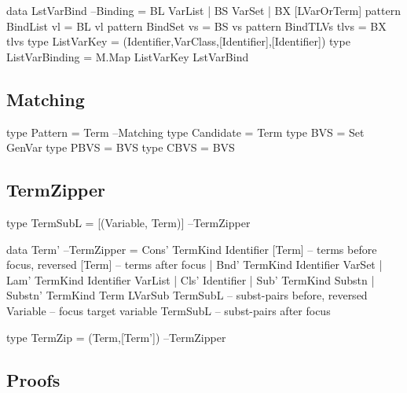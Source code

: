 \begin{code}
data LstVarBind                                                      --Binding
 = BL  VarList
 | BS  VarSet
 | BX  [LVarOrTerm]
pattern BindList vl      =  BL vl
pattern BindSet  vs      =  BS vs
pattern BindTLVs tlvs    =  BX tlvs
type ListVarKey = (Identifier,VarClass,[Identifier],[Identifier])
type ListVarBinding = M.Map ListVarKey LstVarBind
\end{code}

\subsection{Matching}

\begin{code}
type Pattern = Term                                                 --Matching
type Candidate = Term
type BVS = Set GenVar
type PBVS = BVS
type CBVS = BVS
\end{code}

\subsection{TermZipper}

\begin{code}
type TermSubL = [(Variable, Term)]                              --TermZipper
\end{code}

\begin{code}
data Term'                                                        --TermZipper
  = Cons'   TermKind Identifier [Term] -- terms before focus, reversed
                                [Term] -- terms after focus
  | Bnd'   TermKind Identifier VarSet
  | Lam'    TermKind Identifier VarList
  | Cls'             Identifier
  | Sub'    TermKind Substn
  | Substn' TermKind Term LVarSub TermSubL  -- subst-pairs before, reversed
                                  Variable -- focus target variable
                                  TermSubL  -- subst-pairs after focus
\end{code}

\begin{code}
type TermZip = (Term,[Term'])                                    --TermZipper
\end{code}

\subsection{Proofs}

